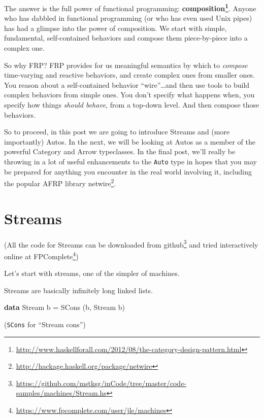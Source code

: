 \documentclass[]{article}
\newenvironment{Shaded}{}{}
\newcommand{\KeywordTok}[1]{\textcolor[rgb]{0.00,0.44,0.13}{\textbf{{#1}}}}
\newcommand{\DataTypeTok}[1]{\textcolor[rgb]{0.56,0.13,0.00}{{#1}}}
\newcommand{\FunctionTok}[1]{\textcolor[rgb]{0.02,0.16,0.49}{{#1}}}
\newcommand{\NormalTok}[1]{{#1}}
\renewcommand{\href}[2]{#2\footnote{\url{#1}}}
\begin{document}
The answer is the full power of functional programming:
\textbf{\href{http://www.haskellforall.com/2012/08/the-category-design-pattern.html}{composition}}.
Anyone who has dabbled in functional programming (or who has even used Unix
pipes) has had a glimpse into the power of composition. We start with simple,
fundamental, self-contained behaviors and compose them piece-by-piece into a
complex one.

So why FRP? FRP provides for us meaningful semantics by which to \emph{compose}
time-varying and reactive behaviors, and create complex ones from smaller ones.
You reason about a self-contained behavior ``wire''\ldots{}and then use tools to
build complex behaviors from simple ones. You don't specify what happens when,
you specify how things \emph{should behave}, from a top-down level. And then
compose those behaviors.

So to proceed, in this post we are going to introduce Streams and (more
importantly) Autos. In the next, we will be looking at Autos as a member of the
powerful Category and Arrow typeclasses. In the final post, we'll really be
throwing in a lot of useful enhancements to the \texttt{Auto} type in hopes that
you may be prepared for anything you encounter in the real world involving it,
including the popular AFRP library
\href{http://hackage.haskell.org/package/netwire}{netwire}.

\section{Streams}\label{streams}

(All the code for Streams can be downloaded
\href{https://github.com/mstksg/inCode/tree/master/code-samples/machines/Stream.hs}{from
github} and tried interactively online
\href{https://www.fpcomplete.com/user/jle/machines}{at FPComplete})

Let's start with streams, one of the simpler of machines.

Streams are basically infinitely long linked lists.

\begin{Shaded}
\begin{Highlighting}[]
\KeywordTok{data} \DataTypeTok{Stream} \NormalTok{b }\FunctionTok{=} \DataTypeTok{SCons} \NormalTok{(b, }\DataTypeTok{Stream} \NormalTok{b)}
\end{Highlighting}
\end{Shaded}

(\texttt{SCons} for ``Stream cons'')
\end{document}
